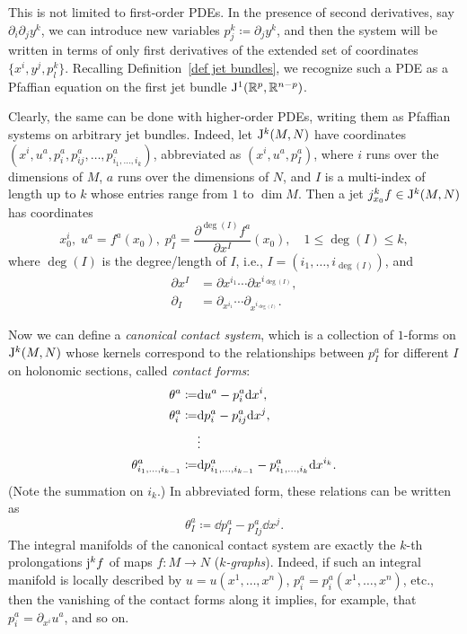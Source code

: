 \begin{rem}\label{rem canonical contact system}
    This is not limited to first-order PDEs. In the presence of second derivatives, say $\partial_i\partial_j y^k$, we can  introduce new variables $p_j^k\coloneqq \partial_j y^k$, and then the system will be written in terms of only first derivatives of the extended set of coordinates $\{x^i,y^j,p^k_l\}$. Recalling Definition~\ref{def jet bundles}, we recognize such a PDE as a Pfaffian equation on the first jet bundle $\mathrm{J}^1(\mathbb{R}^p,\mathbb{R}^{n-p})$. 
    
    Clearly, the same can be done with higher-order PDEs, writing them as Pfaffian systems on arbitrary jet bundles. Indeed, let $\mathrm{J}^k(M,N)$ have coordinates $(x^i,u^a,p_i^a,p_{ij}^a,\ldots,p_{i_1,\ldots,i_k}^a)$, abbreviated as $(x^i,u^a,p_I^a)$, where $i$ runs over the dimensions of $M$, $a$ runs over the dimensions of $N$, and $I$ is a multi-index  of length up to $k$ whose entries range from $1$ to $\dim M$. Then a jet $j_{x_0}^k f\in \mathrm{J}^k(M,N)$ has coordinates 
    \[x^i_0,\; u^a=f^a(x_0),\; p_I^a=\frac{\partial^{\deg(I)}f^a}{\partial x^I}(x_0),\quad 1\leq \deg(I)\leq k,\]
    where $\deg(I)$ is the degree/length of $I$, i.e., $I=(i_1,\ldots,i_{\deg(I)})$, and 
    \begin{align}
        \partial x^I &=\partial x^{i_1}\cdots \partial x^{i_{\deg(I)}},\\
        \partial_I&= \partial_{x^{i_1}}\cdots \partial_{x^{i_{\deg(I)}}}.
    \end{align}
    
    Now we can define a \emph{canonical contact system}, which is a collection of $1$-forms on $\mathrm{J}^k(M,N)$ whose kernels correspond to the relationships between $p_I^a$ for different $I$ on holonomic sections, called \emph{contact forms}:
    \begin{align}
        \theta^a\coloneqq &{\mathrm{d}} u^a-p_i^a{\mathrm{d}} x^i,\notag\\
        \theta^a_i\coloneqq& {\mathrm{d}} p^a_i-p_{ij}^a{\mathrm{d}} x^j,\notag\\
        &\vdots \\
        \theta^a_{i_1,\ldots,i_{k-1}}\coloneqq &{\mathrm{d}} p^a_{i_1,\ldots,i_{k-1}}-p_{i_1,\ldots,i_k}^a{\mathrm{d}} x^{i_k}.\notag
    \end{align}
    (Note the summation on $i_k$.) In abbreviated form, these relations can be written as 
    \[\theta^a_I\coloneqq \dd p_I^a-p^a_{Ij}\dd x^j.\]
    The integral manifolds of the canonical contact system are exactly the $k$-th prolongations $\mathrm{j}^k f$ of maps $f:M\to N$ (\emph{$k$-graphs}). Indeed, if such an integral manifold is locally described by $u=u(x^1,\ldots,x^n)$, $p_i^a=p_i^a(x^1,\ldots,x^n)$,  etc., then the vanishing of the contact forms along it implies, for example, that $p_i^a=\partial_{x^i}u^a$, and so on. 


\end{rem}
